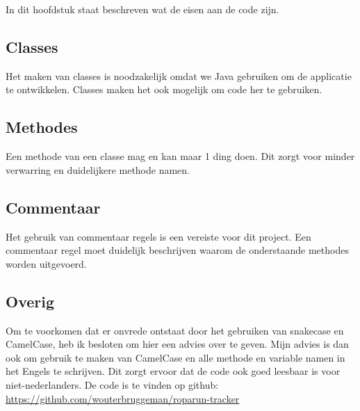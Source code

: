 \documentclass[../main.tex]{subfiles}
\begin{document}
In dit hoofdstuk staat beschreven wat de eisen aan de code zijn.

\subsection{Classes}
Het maken van classes is noodzakelijk omdat we Java gebruiken om de applicatie te ontwikkelen.
Classes maken het ook mogelijk om code her te gebruiken.

\subsection{Methodes}
Een methode van een classe mag en kan maar 1 ding doen.
Dit zorgt voor minder verwarring en duidelijkere methode namen.
\newline

\subsection{Commentaar}
Het gebruik van commentaar regels is een vereiste voor dit project. Een commentaar regel
moet duidelijk beschrijven waarom de onderstaande methodes worden uitgevoerd.
\newline

\subsection{Overig}
Om te voorkomen dat er onvrede ontstaat door het gebruiken van snakecase en CamelCase,
heb ik besloten om hier een advies over te geven.
\newline
Mijn advies is dan ook om gebruik te maken van CamelCase en alle methode en variable
namen in het Engels te schrijven. Dit zorgt ervoor dat de code ook goed leesbaar is voor
niet-nederlanders.
\newline
De code is te vinden op github:
\url{https://github.com/wouterbruggeman/roparun-tracker}
\end{document}
